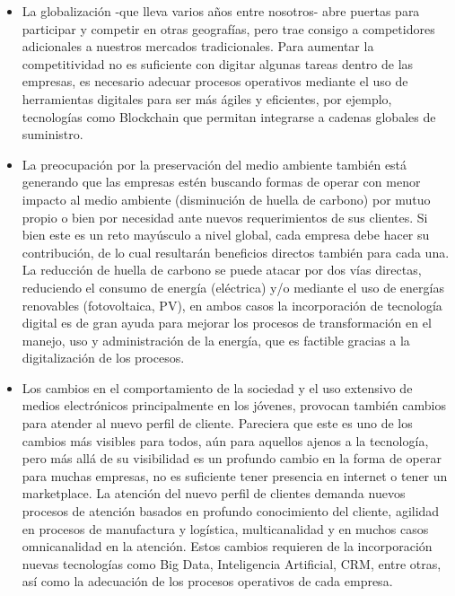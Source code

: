 \documentclass[12pt]{article}
\begin{document}
\begin{itemize}
    \item La globalización -que lleva varios años entre nosotros- abre puertas para participar y competir en otras geografías, pero trae consigo a competidores adicionales a nuestros mercados tradicionales. Para aumentar la competitividad no es suficiente con digitar algunas tareas dentro de las empresas, es necesario adecuar procesos operativos mediante el uso de herramientas digitales para ser más ágiles y eficientes, por ejemplo, tecnologías como Blockchain que permitan integrarse a cadenas globales de suministro.
    \item La preocupación por la preservación del medio ambiente también está generando que las empresas estén buscando formas de operar con menor impacto al medio ambiente (disminución de huella de carbono) por mutuo propio o bien por necesidad ante nuevos requerimientos de sus clientes. Si bien este es un reto mayúsculo a nivel global, cada empresa debe hacer su contribución, de lo cual resultarán beneficios directos también para cada una. La reducción de huella de carbono se puede atacar por dos vías directas, reduciendo el consumo de energía (eléctrica) y/o mediante el uso de energías renovables (fotovoltaica, PV), en ambos casos la incorporación de tecnología digital es de gran ayuda para mejorar los procesos de transformación en el manejo, uso y administración de la energía, que es factible gracias a la digitalización de los procesos.
    \item Los cambios en el comportamiento de la sociedad y el uso extensivo de medios electrónicos principalmente en los jóvenes, provocan también cambios para atender al nuevo perfil de cliente. Pareciera que este es uno de los cambios más visibles para todos, aún para aquellos ajenos a la tecnología, pero más allá de su visibilidad es un profundo cambio en la forma de operar para muchas empresas, no es suficiente tener presencia en internet o tener un marketplace. La atención del nuevo perfil de clientes demanda nuevos procesos de atención basados en profundo conocimiento del cliente, agilidad en procesos de manufactura y logística, multicanalidad y en muchos casos omnicanalidad en la atención. Estos cambios requieren de la incorporación nuevas tecnologías como Big Data, Inteligencia Artificial, CRM, entre otras, así como la adecuación de los procesos operativos de cada empresa.

\end{itemize}
\end{document}
